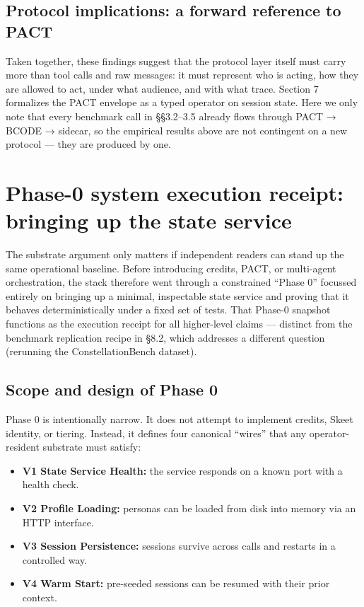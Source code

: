 \subsection{Protocol implications: a forward reference to
PACT}\label{protocol-implications-a-forward-reference-to-pact}

Taken together, these findings suggest that the protocol layer itself
must carry more than tool calls and raw messages: it must represent who
is acting, how they are allowed to act, under what audience, and with
what trace. Section 7 formalizes the PACT envelope as a typed operator
on session state. Here we only note that every benchmark call in
§§3.2--3.5 already flows through PACT → BCODE → sidecar, so the
empirical results above are not contingent on a new protocol --- they
are produced by one.

\section{Phase-0 system execution receipt: bringing up the state
service}\label{phase-0-system-execution-receipt-bringing-up-the-state-service}

The substrate argument only matters if independent readers can stand up
the same operational baseline. Before introducing credits, PACT, or
multi-agent orchestration, the stack therefore went through a
constrained ``Phase 0'' focussed entirely on bringing up a minimal,
inspectable state service and proving that it behaves deterministically
under a fixed set of tests. That Phase-0 snapshot functions as the
execution receipt for all higher-level claims --- distinct from the
benchmark replication recipe in §8.2, which addresses a different
question (rerunning the ConstellationBench dataset).

\subsection{Scope and design of Phase
0}\label{scope-and-design-of-phase-0}

Phase 0 is intentionally narrow. It does not attempt to implement
credits, Skeet identity, or tiering. Instead, it defines four canonical
``wires'' that any operator-resident substrate must satisfy:

\begin{itemize}
\tightlist
\item
  \textbf{V1 State Service Health:} the service responds on a known port
  with a health check.
\item
  \textbf{V2 Profile Loading:} personas can be loaded from disk into
  memory via an HTTP interface.
\item
  \textbf{V3 Session Persistence:} sessions survive across calls and
  restarts in a controlled way.
\item
  \textbf{V4 Warm Start:} pre-seeded sessions can be resumed with their
  prior context.
\end{itemize}

